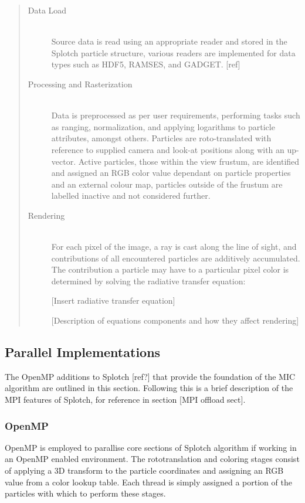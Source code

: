 \documentclass[runningheads,a4paper]{llncs}
\begin{document}
\begin{quote} %
\begin{description}
  \item[Data Load] \hfill \\
  Source data is read using an appropriate reader and stored in the Splotch particle structure, various readers are 
  implemented for data types such as HDF5, RAMSES, and GADGET. [ref]
  \item[Processing and Rasterization] \hfill \\
   Data is preprocessed as per user requirements, performing tasks such as ranging, normalization, and applying 
   logarithms to particle attributes, amongst others. Particles are roto-translated with reference to supplied 
   camera and look-at positions along with an up-vector. Active particles, those within the view frustum, are 
   identified and assigned an RGB color value dependant on particle properties and an external colour map, 
   particles outside of the frustum are labelled inactive and not  considered further.  
  \item[Rendering] \hfill \\
  For each pixel of the image, a ray is cast along the line of sight, and contributions of all encountered particles 
  are additively accumulated. The contribution a particle may have to a particular pixel color is determined by solving 
  the radiative transfer equation:

  [Insert radiative transfer equation]

  [Description of equations components and how they affect rendering]
\end{description}
\end{quote}

\subsection{Parallel Implementations}
\label{sect:mpiopenmp}

The OpenMP additions to Splotch [ref?] that provide the foundation of the MIC algorithm are outlined in this section. 
Following this is a brief description of the MPI features of Splotch, for reference in section [MPI 
offload sect].

\subsubsection{OpenMP}
\label{sect:ompsplotch}

OpenMP is employed to parallise core sections of Splotch algorithm if working in an OpenMP enabled environment. 
The rototranslation and coloring stages consist of applying a 3D transform to the particle coordinates and assigning 
an RGB value from a color lookup table. Each thread is simply assigned a portion of the particles with which to 
perform these stages.
\end{document}
